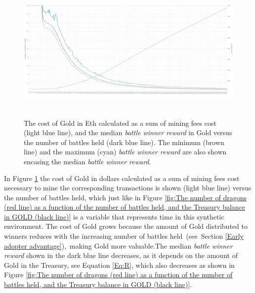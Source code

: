 \documentclass[12pt]{article}
\begin{document}
{\begin{figure}[H]
	\begin{Center}
		\includegraphics[width=6.27in,height=2.76in]{./media/CS1image2.png}
		\caption{The cost of Gold in Eth calculated as a sum of mining fees cost (light blue line), and the median {\it battle winner reward} in Gold versus the number of battles held (dark blue line).  The minimum (brown line) and the maximum (cyan) {\it battle winner reward} are also shown encasing the median {\it battle winner reward}.}
		\label{fig:The cost of Gold in dollars calculated as a sum of mining fees cost (light blue line), and the median battle reward in Gold versus the number of battles held (dark blue line).}
	\end{Center}
\end{figure}




In Figure \ref{fig:The cost of Gold in dollars calculated as a sum of mining fees cost (light blue line), and the median battle reward in Gold versus the number of battles held (dark blue line).} the cost of Gold in dollars calculated as a sum of mining fees cost necessary to mine the corresponding transactions is shown (light blue line) versus the number of battles held, which just like in Figure \ref{fig:The number of dragons (red line) as a function of the number of battles held, and the Treasury balance in GOLD (black line)} is a variable that represents time in this synthetic environment. The cost of Gold grows because the amount of Gold distributed to winners reduces with the increasing number of battles held\ (see\ Section   \ref{Early adopter advantage}),\ making Gold more valuable.The median {\it battle winner reward} shown in the dark blue line decreases, as it depends on the amount of Gold in the Treasury, see Equation  \ref{Eq:R}, which also decreases as shown in Figure \ref{fig:The number of dragons (red line) as a function of the number of battles held, and the Treasury balance in GOLD (black line)}.\par

}
\end{document}
